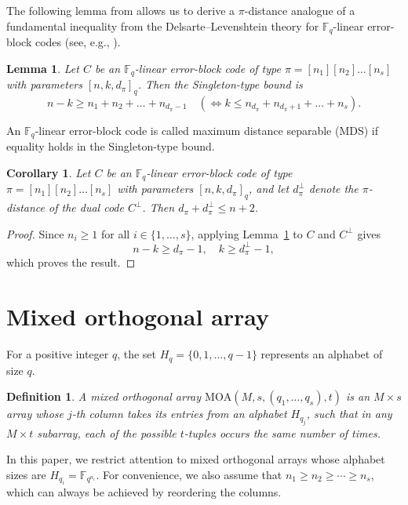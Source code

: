 \documentclass[11pt]{article}
\newtheorem{Definition}[Theorem]{Definition}
\newtheorem{Corollary}[Theorem]{Corollary}
\newtheorem{Definition and Notation}[Theorem]{Definition and Notation}
\newtheorem{Lemma}[Theorem]{Lemma}
\begin{document}
The following lemma from \cite{Feng2006} allows us to derive a $\pi$-distance analogue of a fundamental inequality from the Delsarte–Levenshtein theory for $\mathbb{F}_q$-linear error-block codes (see, e.g., \cite[Theorem 4.5]{Levenshtein}).

\begin{Lemma}\cite[Theorem 2.1]{Feng2006}\label{makh}
Let $C$ be an $\mathbb F_q$-linear error-block code of type $\pi = [n_1][n_2]\dots[n_s]$ with parameters $[n,k,d_\pi]_q$. Then the Singleton-type bound is
\begin{equation}
n - k \ge n_1 + n_2 + \dots + n_{d_\pi-1} \quad \left( \iff k \le n_{d_\pi} + n_{d_\pi+1} + \dots + n_s \right).
\end{equation}
\end{Lemma}
An $\mathbb F_q$-linear error-block code is called maximum distance separable (MDS) if equality holds in the Singleton-type bound.
\begin{Corollary}\label{sari}
Let $C$ be an $\mathbb{F}_q$-linear error-block code of type $\pi=[n_1][n_2]\dots[n_s]$ with parameters $[n,k,d_\pi]_q$, and let $d_\pi^\perp$ denote the $\pi$-distance of the dual code $C^\perp$. Then
$d_\pi+d_\pi^\perp\le n+2$.
\end{Corollary}
\begin{proof}
    Since $n_i \ge 1$ for all $i \in \{1, \dots, s\}$, applying Lemma~\ref{makh}  to $C$ and $C^\perp$ gives
$$
n - k  \ge d_{\pi} - 1, \quad k \ge d_{\pi}^\perp - 1,
$$
which proves the result.
\end{proof}

\section{Mixed orthogonal array}
For a positive integer $q$, the set $H_q = \{0, 1, \ldots, q-1\}$ represents an alphabet of size $q$. 
\begin{Definition}
A mixed orthogonal array $\mathrm{MOA}(M, s, (q_1, \dots, q_s), t)$ is an $M \times s$ array whose $j$-th column takes its entries from an alphabet $H_{q_j}$, such that in any $M \times t$ subarray, each of the possible $t$-tuples occurs the same number of times.
\end{Definition}
In this paper, we restrict attention to mixed orthogonal arrays whose alphabet sizes are $H_{q_i}=\mathbb{F}_{q^{n_i}}$. For convenience, we also assume that $n_1\ge n_2\ge\cdots\ge n_s$, which can always be achieved by reordering the columns.
\end{document}
